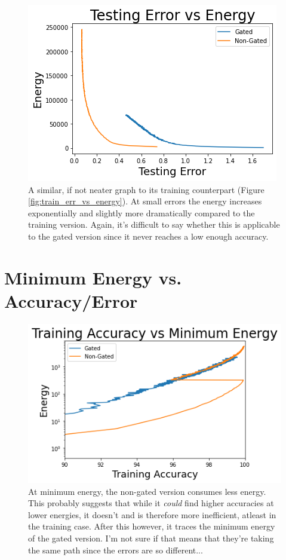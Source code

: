 \documentclass[prl,superscriptaddress,showpacs,twocolumn]{revtex4-1}
\begin{document}
\begin{figure}[H]
    \centering
    \includegraphics[width=\linewidth]{figures/testing_error_vs_energy.png}
    \caption{A similar, if not neater graph to its training counterpart (Figure \ref{fig:train_err_vs_energy}). At small errors the energy increases exponentially and slightly more dramatically compared to the training version. Again, it's difficult to say whether this is applicable to the gated version since it never reaches a low enough accuracy.}
    \label{fig:test_err_vs_energy}
\end{figure}

\section{Minimum Energy vs. Accuracy/Error}

\begin{figure}[H]
    \centering
    \includegraphics[width=\linewidth]{figures/training_accuracy_vs_minimum_energy.png}
    \caption{At minimum energy, the non-gated version consumes less energy. This probably suggests that while it \textit{could} find higher accuracies at lower energies, it doesn't and is therefore more inefficient, atleast in the training case. After this however, it traces the minimum energy of the gated version. I'm not sure if that means that they're taking the same path since the errors are so different...}
    \label{fig:train_acc_vs_min_energy}
\end{figure}
\end{document}
